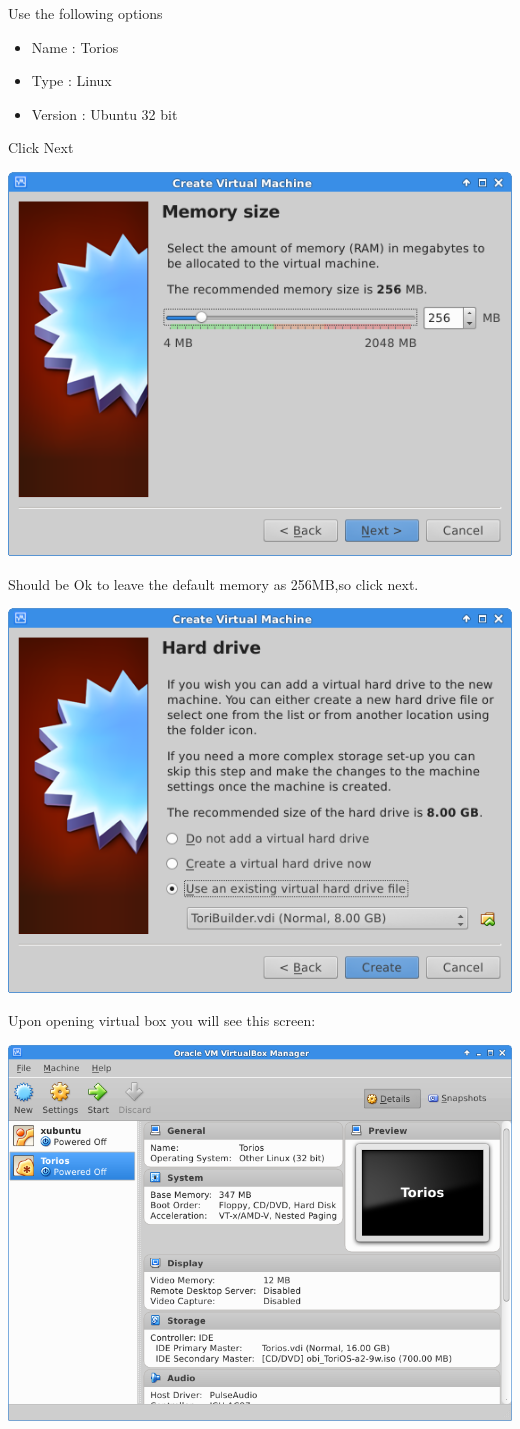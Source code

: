\documentclass[12pt,a4paper]{book}
\begin{document}
Use the following options
\begin{itemize}
\item Name : Torios
\item Type : Linux
\item Version : Ubuntu 32 bit
\end{itemize}

Click Next

\begin{center}
\includegraphics[width=0.7\linewidth]{ToriosTest02}
\end{center}

Should be Ok to leave the default memory as 256MB,so click next.

\begin{center}
\includegraphics[width=0.7\linewidth]{ToriosTest03}
\end{center}

Upon opening virtual box you will see this screen:
\begin{center}
\includegraphics[width=0.7\linewidth]{virtualbox}
\end{center}
\end{document}
